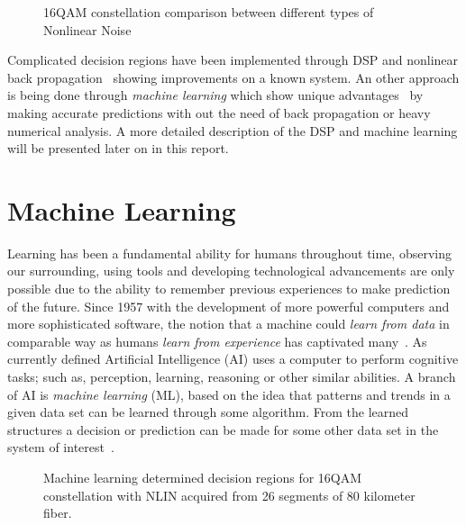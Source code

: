 \begin{figure}[h!]
 \centering
{}
  \qquad
 \caption{16QAM constellation comparison between different types of Nonlinear Noise }
 \label{fig:NLPNcons}
\end{figure}
 Complicated decision regions have been implemented through DSP and nonlinear back propagation~\cite{NLPNDSP} showing improvements on a known system. An other approach is being done through \textit{machine learning} which show unique advantages~\cite{Nonparameter,Zibar:12} by making accurate predictions with out the need of back propagation or heavy numerical analysis. A more detailed description of the DSP and machine learning will be presented later on in this report.

% 	
\section{Machine Learning}
%
Learning has been a fundamental ability for humans throughout time, observing our surrounding, using tools and developing technological advancements are only possible due to the ability to remember previous  experiences to make prediction of the future. Since 1957 with the development of more powerful computers and more sophisticated software, the notion that a machine could \emph{learn from data} in comparable way as humans\emph{ learn from experience} has captivated many~\cite{kaplan2019siri}. As currently defined Artificial Intelligence (AI) uses a computer to perform cognitive tasks; such as, perception, learning, reasoning or other similar abilities. A branch of AI is \textit{machine learning} (ML), based on the idea that patterns and trends in a given data set can be learned through some algorithm. From the learned structures a decision or prediction can be made for some other data set in the system of interest~\cite{marsland2014machine}.

\begin{figure}[h!]
 \centering
{}
  \qquad
 \caption{Machine learning determined decision regions for  16QAM constellation with NLIN acquired from 26 segments of 80 kilometer fiber.  }
 \label{fig:MLcons}
\end{figure}

